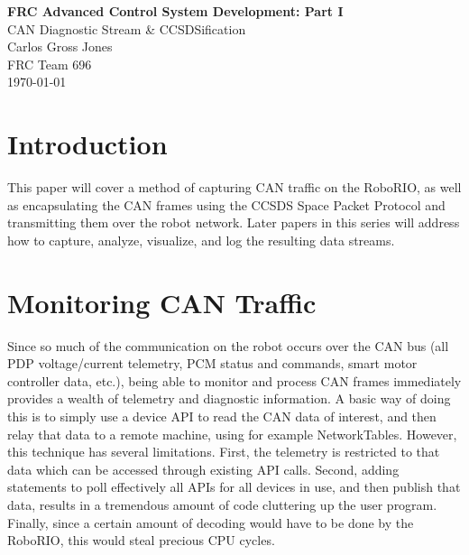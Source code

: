 \documentclass[12pt]{article}
\begin{document}
	\begin{titlepage}
	\begin{center}
		
	
	\vspace*{1in}
	{\Huge \textbf{FRC Advanced Control System Development: Part I}}\\
	\vspace{0.25in}
	{\LARGE CAN Diagnostic Stream \& CCSDSification}\\
	\vspace{0.5in}
	{\Large Carlos Gross Jones}\\
	\vspace{0.1in}
	{\Large FRC Team 696}\\
	\vspace{0.1in}
	{\Large \today}\\
\end{center}
	
\end{titlepage}


\section{Introduction}
\par This paper will cover a method of capturing CAN traffic on the RoboRIO, as well as encapsulating the CAN frames using the CCSDS Space Packet Protocol and transmitting them over the robot network. Later papers in this series will address how to capture, analyze, visualize, and log the resulting data streams. 


\section{Monitoring CAN Traffic}
\par Since so much of the communication on the robot occurs over the CAN bus (all PDP voltage/current telemetry, PCM status and commands, smart motor controller data, etc.), being able to monitor and process CAN frames immediately provides a wealth of telemetry and diagnostic information. A basic way of doing this is to simply use a device API to read the CAN data of interest, and then relay that data to a remote machine, using for example NetworkTables. However, this technique has several limitations. First, the telemetry is restricted to that data which can be accessed through existing API calls. Second, adding statements to poll effectively all APIs for all devices in use, and then publish that data, results in a tremendous amount of code cluttering up the user program. Finally, since a certain amount of decoding would have to be done by the RoboRIO, this would steal precious CPU cycles. 
\end{document}
